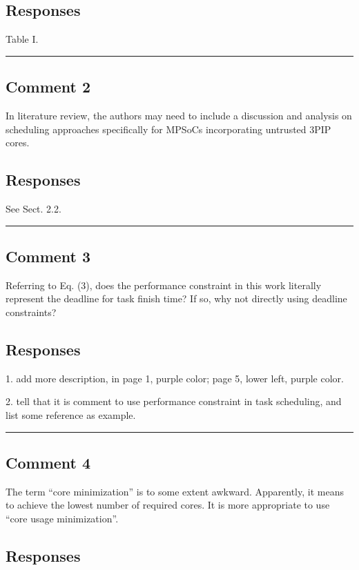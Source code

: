 \documentclass[10pt,journal, compsoc]{IEEEtran}
\begin{document}
\subsection*{Responses}

Table I.

\noindent\rule[0.25\baselineskip]{252pt}{1pt}

\subsection*{Comment 2}
In literature review, the authors may need to include a discussion and analysis on scheduling approaches specifically for MPSoCs incorporating untrusted 3PIP cores.

\subsection*{Responses}

See Sect. 2.2.

\noindent\rule[0.25\baselineskip]{252pt}{1pt}


\subsection*{Comment 3}
Referring to Eq. (3), does the performance constraint in this work literally represent the deadline for task finish time? If so, why not directly using deadline constraints?


\subsection*{Responses}

1. add more description, in page 1, purple color; page 5, lower left, purple color.

2. tell that it is comment to use performance constraint in task scheduling, and list some reference as example.


\noindent\rule[0.25\baselineskip]{252pt}{1pt}



\subsection*{Comment 4}
The term ``core minimization'' is to some extent awkward. Apparently, it means to achieve the lowest number of required cores. It is more appropriate to use ``core usage minimization''.

\subsection*{Responses}
\end{document}
